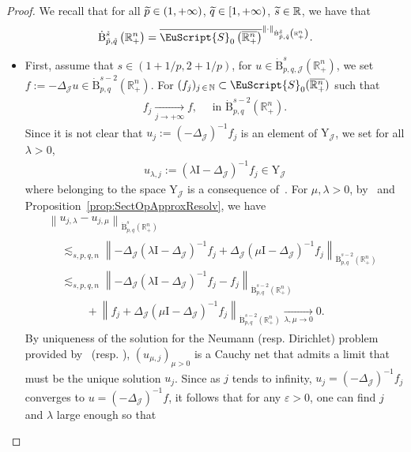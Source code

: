 \documentclass[10pt]{amsart}
\theoremstyle{definition}\newtheorem{defi}[theo]{Definition}\newtheorem{rema}[theo]{Remark}\newtheorem{exam}[theo]{Example}\newtheorem{exem}[theo]{Example}\newtheorem{nota}[theo]{Notation}
\newcommand{\bbR}{\mathbb{R}}
\newcommand{\bbN}{\mathbb{N}}
\newcommand{\rmB}{\mathrm{B}}
\newcommand{\rmI}{\mathrm{I}}
\newcommand{\rmY}{\mathrm{Y}}
\newcommand{\clJ}{\mathcal{J}}
\newcommand{\eus}{\EuScript}
\let\oldtilde\tilde
\renewcommand*{\tilde}[1]{\mathchoice{\widetilde{#1}}{\widetilde{#1}}{\oldtilde{#1}}{\oldtilde{#1}}}
\begin{document}
\begin{proof}
We recall that for all $\tilde{p}\in(1,+\infty)$, $\tilde{q}\in[1,+\infty)$, $\tilde{s}\in\bbR$, we have that
\begin{align*}
\dot{\rmB}^{\tilde{s}}_{\tilde{p},\tilde{q}}\left(\bbR^n_+\right) = \overline{\eus{S}_0\left(\overline{\bbR^n_+}\right)}^{\|\cdot\|_{\dot{\rmB}^{\tilde{s}}_{\tilde{p},\tilde{q}}\left(\bbR^n_+\right)}} .
\end{align*}
\begin{itemize}
\item First, assume that $s\in(1+1/p,2+1/p)$, for $u\in\dot{\rmB}^{s}_{p,q,\clJ}(\bbR^n_+)$, we set $f:=-\Delta_{\clJ}u \in\dot{\rmB}^{s-2}_{p,q}(\bbR^n_+)$. For $(f_j)_{j\,\in\,\bbN} \subset \eus{S}_0(\overline{\bbR^n_+})$ such that
\begin{align*}
f_j \xrightarrow[j\rightarrow +\infty]{} f,\quad \text{ in } \dot{\rmB}^{s-2}_{p,q}\left(\bbR^n_+\right).
\end{align*}
Since it is not clear that $u_j:=(-\Delta_{\clJ})^{-1}f_j $ is an element of $\rmY_\clJ$, we set for all $\lambda>0$,
\begin{align*}
u_{\lambda,j}:= (\lambda\rmI -\Delta_{\clJ})^{-1}f_j \in \rmY_{\clJ}
\end{align*}
where belonging to the space $\rmY_{\clJ}$ is a consequence of~\cite[Propositions~5.4~\&~5.6]{Gaudin2022}. For $\mu,\lambda>0$, by~\cite[Propositions~5.7~\&~5.8]{Gaudin2022} and Proposition~\ref{prop:SectOpApproxResolv}, we have
\begin{multline*}
\left\| u_{j,\lambda}-u_{j,\mu} \right\|_{\dot{\rmB}^{s}_{p,q}\left(\bbR^n_+\right)}\\
\begin{aligned}
&\lesssim_{s,p,q,n} \left\| -\Delta_{\clJ}\left(\lambda\rmI -\Delta_{\clJ}\right)^{-1}f_j + \Delta_{\clJ}\left(\mu\rmI -\Delta_{\clJ}\right)^{-1}f_j \right\|_{\dot{\rmB}^{s-2}_{p,q}\left(\bbR^n_+\right)}\\
&\lesssim_{s,p,q,n} \left\| -\Delta_{\clJ}\left(\lambda\rmI -\Delta_{\clJ}\right)^{-1}f_j -f_j\right\|_{\dot{\rmB}^{s-2}_{p,q}\left(\bbR^n_+\right)}\\
&\qquad\:+\left\| f_j + \Delta_{\clJ}\left(\mu\rmI -\Delta_{\clJ}\right)^{-1}f_j\right\|_{\dot{\rmB}^{s-2}_{p,q}\left(\bbR^n_+\right)}
\xrightarrow[\lambda,\mu\rightarrow 0]{} 0 .
\end{aligned}
\end{multline*}
By uniqueness of the solution for the Neumann (resp. Dirichlet) problem provided by~\cite[Proposition~5.8]{Gaudin2022} (resp. \cite[Proposition~5.7]{Gaudin2022}), $(u_{\mu,j})_{\mu>0}$ is a Cauchy net that admits a limit that must be the unique solution $u_j$. Since as $j$ tends to infinity, $u_j=(-\Delta_\clJ)^{-1}f_j$ converges to $u=(-\Delta_\clJ)^{-1}f$, it follows that for any $\varepsilon>0$, one can find $j$ and $\lambda$ large enough so that

\end{itemize}
\end{proof}
\end{document}

